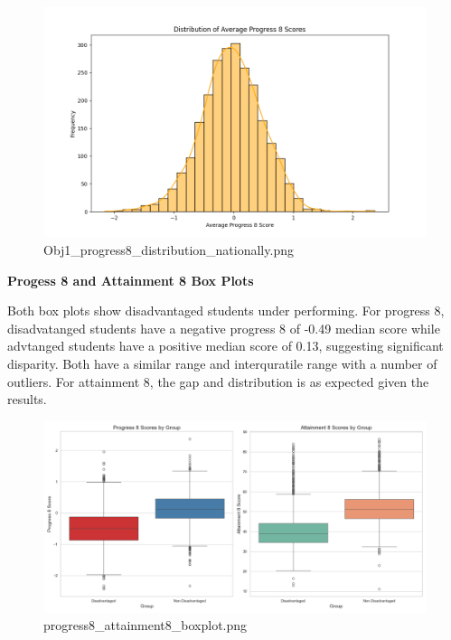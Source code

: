 \documentclass[
  letterpaper,
  DIV=11,
  numbers=noendperiod]{scrartcl}
\begin{document}
\begin{figure}[H]

{\centering \includegraphics{images/Obj1_progress8_distribution_nationally.png}

}

\caption{Obj1\_progress8\_distribution\_nationally.png}

\end{figure}%

\textbf{Progess 8 and Attainment 8 Box Plots}

Both box plots show disadvantaged students under performing. For
progress 8, disadvatanged students have a negative progress 8 of -0.49
median score while advtanged students have a positive median score of
0.13, suggesting significant disparity. Both have a similar range and
interquratile range with a number of outliers. For attainment 8, the gap
and distribution is as expected given the results.

\begin{figure}[H]

{\centering \includegraphics{images/obj1_progress8_attainment8_boxplot.png}

}

\caption{progress8\_attainment8\_boxplot.png}

\end{figure}%
\end{document}
